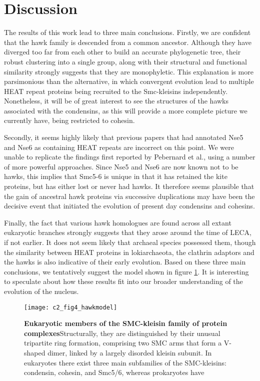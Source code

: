 \documentclass[a4paper,11pt,twoside,openright]{scrbook}
\begin{document}
\clearpage

\section{Discussion}

The results of this work lead to three main conclusions. Firstly, we are confident that the hawk family is descended from a common ancestor. Although they have diverged too far from each other to build an accurate phylogenetic tree, their robust clustering into a single group, along with their structural and functional similarity strongly suggests that they are monophyletic. This explanation is more parsimonious than the alternative, in which convergent evolution lead to multiple HEAT repeat proteins being recruited to the Smc-kleisins independently. Nonetheless, it will be of great interest to see the structures of the hawks associated with the condensins, as this will provide a more complete picture we currently have, being restricted to cohesin.

Secondly, it seems highly likely that previous papers that had annotated Nse5 and Nse6 as containing HEAT repeats are incorrect on this point. We were unable to replicate the findings first reported by Pebernard et al., using a number of more powerful approaches. Since Nse5 and Nse6 are now known not to be hawks, this implies that Smc5-6 is unique in that it has retained the kite proteins, but has either lost or never had hawks. It therefore seems plausible that the gain of ancestral hawk proteins via successive duplications may have been the decisive event that initiated the evolution of present day condensins and cohesins.

Finally, the fact that various hawk homologues are found across all extant eukaryotic branches strongly suggests that they arose around the time of LECA, if not earlier. It does not seem likely that archaeal species possessed them, though the similarity between HEAT proteins in lokiarchaeota, the clathrin adaptors and the hawks is also indicative of their early evolution. Based on these three main conclusions, we tentatively suggest the model shown in figure \ref{c2f4}. It is interesting to speculate about how these results fit into our broader understanding of the evolution of the nucleus.

\begin{figure}[h]
\fcapsideright
    {\caption[Eukaryotic members of the SMC-kleisin family of protein complexes]{\sffamily\textbf{Eukaryotic members of the SMC-kleisin family of protein complexes}\newline \small Structurally, they are distinguished by their unusual tripartite ring formation, comprising two SMC arms that form a V-shaped dimer, linked by a largely disorded kleisin subunit. In eukaryotes there exist three main subfamilies of the SMC-kleisins: condensin, cohesin, and Smc5/6, whereas prokaryotes have }\label{c2f4}}
    {\texttt{[image: c2\_fig4\_hawkmodel]}}
\end{figure}
\end{document}
